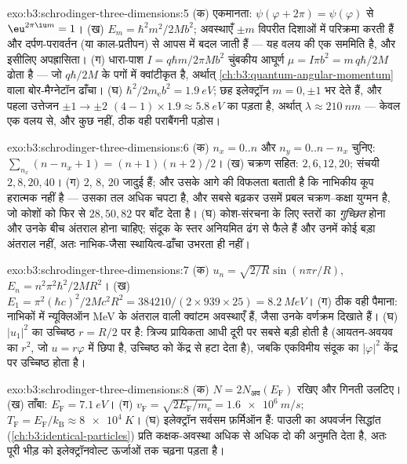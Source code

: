 \begin{solution}{exo:b3:schrodinger-three-dimensions:5}
(क) एकमानता: $\psi(\varphi + 2\pi) = \psi(\varphi)$ से
$\eu^{2\pi\iu m} = 1$। (ख) $E_m = \hbar^2m^2/2Mb^2$; अवस्थाएँ $\pm
m$ विपरीत दिशाओं में परिक्रमा करती हैं और दर्पण-परावर्तन (या
काल-प्रतीपन) से आपस में बदल जाती हैं --- यह वलय की एक सममिति है, और
इसीलिए अपह्रासिता। (ग)
धारा-पाश $I = q\hbar m/2\pi Mb^2$ चुंबकीय आघूर्ण
$\mu = I\pi b^2 = m\,q\hbar/2M$ ढोता है --- जो $q\hbar/2M$ के पगों में
क्वांटीकृत है, अर्थात् \cref{ch:b3:quantum-angular-momentum} वाला
बोर-मैग्नेटॉन ढाँचा।
(घ) $\hbar^2/2m_{\text{e}}b^2 = \qty{1.9}{eV}$; छह इलेक्ट्रॉन
$m = 0, \pm1$ भर देते हैं, और पहला उत्तेजन $\pm1 \to \pm2$
$(4-1) \times 1.9 \approx \qty{5.8}{eV}$ का पड़ता है, अर्थात् $\lambda \approx
\qty{210}{nm}$ --- केवल एक वलय से, और कुछ नहीं, ठीक वही पराबैंगनी पड़ोस।
\end{solution}

\begin{solution}{exo:b3:schrodinger-three-dimensions:6}
(क) $n_x = 0..n$ और $n_y = 0..n - n_x$ चुनिए: $\sum_{n_x}(n - n_x
+ 1) = (n+1)(n+2)/2$। (ख) चक्रण सहित: $2, 6, 12, 20$; संचयी $2,
8, 20, 40$। (ग) $2$, $8$, $20$ जादुई हैं; और उसके आगे की विफलता
बताती है कि नाभिकीय कूप हरात्मक नहीं है --- उसका तल अधिक चपटा है, और
सबसे बढ़कर उसमें प्रबल चक्रण--कक्षा युग्मन है, जो कोशों को फिर से
$28, 50, 82$ पर बाँट देता है। (घ) कोश-संरचना के लिए स्तरों का
\emph{गुच्छित} होना और उनके बीच अंतराल होना चाहिए; संदूक के स्तर
अनियमित ढंग से फैले हैं और उनमें कोई बड़ा अंतराल नहीं, अतः
नाभिक-जैसा स्थायित्व-ढाँचा उभरता ही नहीं।
\end{solution}

\begin{solution}{exo:b3:schrodinger-three-dimensions:7}
(क) $u_n = \sqrt{2/R}\sin(n\pi r/R)$, $E_n = n^2\pi^2\hbar^2/2MR^2$।
(ख) $E_1 = \pi^2(\hbar c)^2/2Mc^2R^2 = 384210/(2 \times 939 \times
25) = \qty{8.2}{MeV}$। (ग) ठीक वही पैमाना: नाभिकों में न्यूक्लिऑन
MeV के अंतराल वाली क्वांटम अवस्थाएँ हैं, जैसा उनके वर्णक्रम दिखाते हैं। (घ) $|u_1|^2$
का उच्चिष्ठ $r = R/2$ पर है: त्रिज्य प्रायिकता आधी दूरी पर सबसे बड़ी
होती है (आयतन-अवयव का $r^2$, जो $u = r\varphi$ में छिपा है, उच्चिष्ठ
को केंद्र से हटा देता है), जबकि एकविमीय संदूक का $|\varphi|^2$
केंद्र पर उच्चिष्ठ होता है।
\end{solution}

\begin{solution}{exo:b3:schrodinger-three-dimensions:8}
(क) $N = 2N_{\text{अव}}(E_{\text{F}})$ रखिए और गिनती उलटिए।
(ख) ताँबा: $E_{\text{F}} = \qty{7.1}{eV}$। (ग) $v_{\text{F}} =
\sqrt{2E_{\text{F}}/m_{\text{e}}} = \qty{1.6e6}{m/s}$;
$T_{\text{F}} = E_{\text{F}}/k_{\text{B}} \approx \qty{8e4}{K}$। (घ)
इलेक्ट्रॉन सर्वसम फ़र्मिऑन हैं: पाउली का अपवर्जन सिद्धांत
(\cref{ch:b3:identical-particles}) प्रति कक्षक-अवस्था अधिक से अधिक दो
की अनुमति देता है, अतः पूरी भीड़ को इलेक्ट्रॉनवोल्ट ऊर्जाओं तक चढ़ना पड़ता है।
\end{solution}

